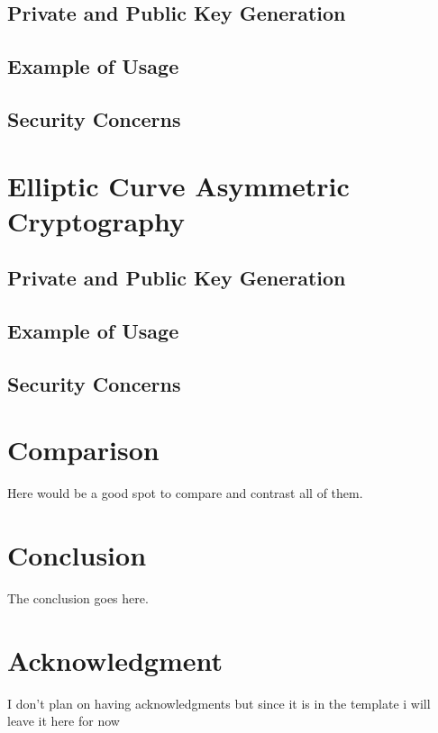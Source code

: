 \documentclass[conference]{IEEEtran}
\begin{document}
\subsection{Private and Public Key Generation}

\subsection{Example of Usage}

\subsection{Security Concerns}

\section{Elliptic Curve Asymmetric Cryptography}

\subsection{Private and Public Key Generation}

\subsection{Example of Usage}

\subsection{Security Concerns}


\section{Comparison}
Here would be a good spot to compare and contrast all of them.


\section{Conclusion}
The conclusion goes here.


\section*{Acknowledgment}

I don't plan on having acknowledgments but since it is in the template i will leave it here for now




\end{document}
